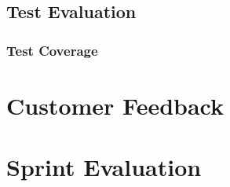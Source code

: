 \subsection{Test Evaluation}

\subsubsection{Test Coverage}

\section{Customer Feedback}


\section{Sprint Evaluation}


